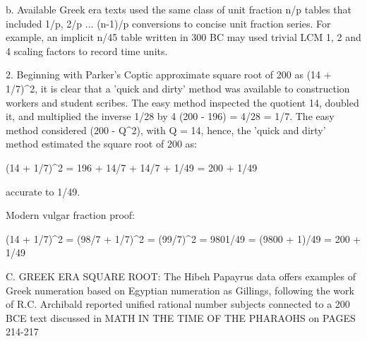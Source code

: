 \documentclass[12pt]{article}
\begin{document}
b. Available Greek era texts used the same class of unit fraction n/p tables that included 1/p, 2/p ... (n-1)/p conversions to concise unit fraction series. For example, an implicit  n/45 table written in 300 BC may used trivial LCM 1, 2 and 4 scaling factors to record time units. 

2. Beginning with Parker's Coptic approximate square root of 200 as (14 + 1/7)^2, it is clear that a 'quick and dirty' method was available to construction workers and student scribes. The easy method inspected the quotient 14, doubled it, and multiplied the inverse 1/28 by 4 (200 - 196) = 4/28 = 1/7. The easy method considered (200 - Q^2), with Q = 14,  hence, the 'quick and dirty' method estimated the square root of 200 as:

(14 + 1/7)^2 = 196 + 14/7 + 14/7 + 1/49 = 200 + 1/49  

accurate to 1/49.

Modern vulgar fraction proof: 

(14 + 1/7)^2 = (98/7 + 1/7)^2 = (99/7)^2 = 9801/49 = (9800 + 1)/49 = 200 + 1/49

C. GREEK ERA SQUARE ROOT: The Hibeh Papayrus  data offers examples of Greek numeration based on Egyptian numeration as Gillings, following the work of R.C. Archibald reported unified rational number subjects connected to a 200 BCE text discussed in MATH IN THE TIME OF THE PHARAOHS on PAGES 214-217
\end{document}
